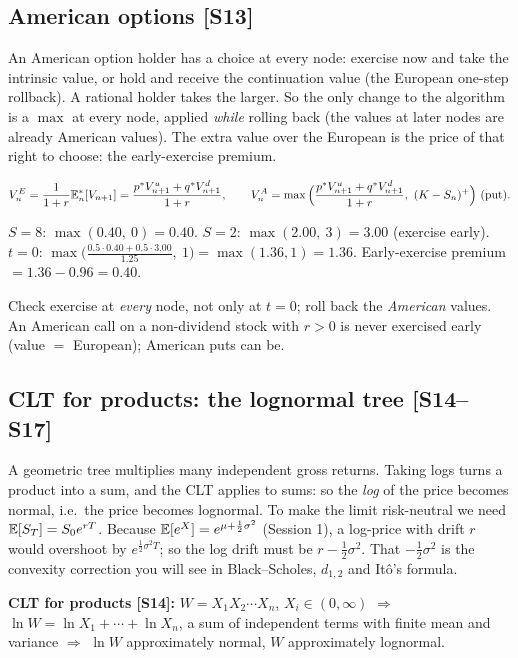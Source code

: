 \documentclass[10pt]{article}
\begin{document}
\subsection{American options [S13]}
\begin{idea}
An American option holder has a choice at every node: exercise now and take the intrinsic value, or hold and receive the continuation value (the European one-step rollback). A rational holder takes the larger. So the only change to the algorithm is a $\max$ at every node, applied \emph{while} rolling back (the values at later nodes are already American values). The extra value over the European is the price of that right to choose: the early-exercise premium.
\end{idea}
\[V^E_n=\frac{1}{1+r}\E^*_n[V_{n+1}]=\frac{p^*V^u_{n+1}+q^*V^d_{n+1}}{1+r},\qquad V^A_n=\max\Big(\frac{p^*V^u_{n+1}+q^*V^d_{n+1}}{1+r},\ (K-S_n)^+\Big)\ \text{(put)}.\]
\begin{where}
\end{where}
\begin{worked}
$S=8$: $\max(0.40,\ 0)=0.40$. $S=2$: $\max(2.00,\ 3)=3.00$ (exercise early). $t=0$: $\max\big(\frac{0.5\cdot0.40+0.5\cdot3.00}{1.25},\ 1\big)=\max(1.36,1)=1.36$. Early-exercise premium $=1.36-0.96=0.40$.
\end{worked}
\begin{exam}
Check exercise at \emph{every} node, not only at $t=0$; roll back the \emph{American} values. \beyond{} An American call on a non-dividend stock with $r>0$ is never exercised early (value $=$ European); American puts can be.
\end{exam}

\subsection{CLT for products: the lognormal tree [S14--S17]}
\begin{idea}
A geometric tree multiplies many independent gross returns. Taking logs turns a product into a sum, and the CLT applies to sums: so the \emph{log} of the price becomes normal, i.e.\ the price becomes lognormal. To make the limit risk-neutral we need $\mathbb{E}[S_T]=S_0e^{rT}$. Because $\mathbb{E}[e^{X}]=e^{\mu+\frac12\sigma^2}$ (Session 1), a log-price with drift $r$ would overshoot by $e^{\frac12\sigma^2T}$; so the log drift must be $r-\frac12\sigma^2$. That $-\frac12\sigma^2$ is the convexity correction you will see in Black--Scholes, $d_{1,2}$ and Itô's formula.
\end{idea}
\textbf{CLT for products [S14]:} $W=X_1X_2\cdots X_n$, $X_i\in(0,\infty)$ $\Rightarrow$ $\ln W=\ln X_1+\cdots+\ln X_n$, a sum of independent terms with finite mean and variance $\Rightarrow$ $\ln W$ approximately normal, $W$ approximately lognormal.
\end{document}
